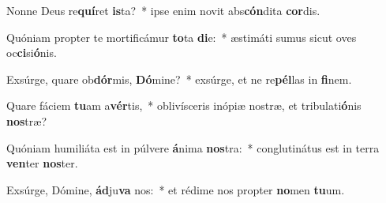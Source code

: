 \item Nonne Deus re\textbf{quí}ret \textbf{is}ta?~* ipse enim novit abs\textbf{cón}dita \textbf{cor}dis.
\item Quóniam propter te mortificámur \textbf{to}ta \textbf{di}e:~* æstimáti sumus sicut oves oc\textbf{ci}si\textbf{ó}nis.
\item Exsúrge, quare ob\textbf{dór}mis, \textbf{Dó}mine?~* exsúrge, et ne re\textbf{pél}las in \textbf{fi}nem.
\item Quare fáciem \textbf{tu}am a\textbf{vér}tis,~* oblivísceris inópiæ nostræ, et tribulati\textbf{ó}nis \textbf{nos}træ?
\item Quóniam humiliáta est in púlvere \textbf{á}nima \textbf{nos}tra:~* conglutinátus est in terra \textbf{ven}ter \textbf{nos}ter.
\item Exsúrge, Dómine, \textbf{ád}ju\textbf{va} nos:~* et rédime nos propter \textbf{no}men \textbf{tu}um.
